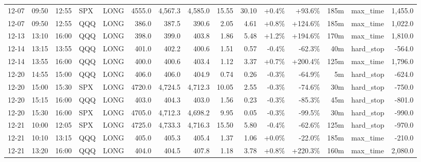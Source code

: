 \documentclass[11pt,a4paper,twoside]{article}
\begin{document}
\begin{landscape}
\begin{center}
\begin{longtable}{>{\color{txtmain}}l l l l l r r r r r r r r >{\color{txtmain}}l r}
12-07 & 09:50 & 12:55 & SPX & LONG & 4555.0 & 4,567.3 & 4,585.0 & 15.55 & 30.10 & \textcolor{wingreen}{+0.4\%} & \textcolor{wingreen}{+93.6\%} & 185m & max\_time & \textcolor{wingreen}{1,455.0} \\
12-07 & 09:50 & 12:55 & QQQ & LONG & 386.0 & 387.5 & 390.6 & 2.05 & 4.61 & \textcolor{wingreen}{+0.8\%} & \textcolor{wingreen}{+124.6\%} & 185m & max\_time & \textcolor{wingreen}{1,022.0} \\
12-13 & 13:10 & 16:00 & QQQ & LONG & 398.0 & 399.0 & 403.8 & 1.86 & 5.48 & \textcolor{wingreen}{+1.2\%} & \textcolor{wingreen}{+194.6\%} & 170m & max\_time & \textcolor{wingreen}{1,810.0} \\
12-14 & 13:15 & 13:55 & QQQ & LONG & 401.0 & 402.2 & 400.6 & 1.51 & 0.57 & \textcolor{lossred}{-0.4\%} & \textcolor{lossred}{-62.3\%} & 40m & hard\_stop & \textcolor{lossred}{-564.0} \\
12-14 & 13:55 & 16:00 & QQQ & LONG & 400.0 & 400.6 & 403.4 & 1.12 & 3.37 & \textcolor{wingreen}{+0.7\%} & \textcolor{wingreen}{+200.4\%} & 125m & max\_time & \textcolor{wingreen}{1,796.0} \\
12-20 & 14:55 & 15:00 & QQQ & LONG & 406.0 & 406.0 & 404.9 & 0.74 & 0.26 & \textcolor{lossred}{-0.3\%} & \textcolor{lossred}{-64.9\%} & 5m & hard\_stop & \textcolor{lossred}{-624.0} \\
12-20 & 15:00 & 15:30 & SPX & LONG & 4720.0 & 4,724.5 & 4,712.3 & 10.05 & 2.55 & \textcolor{lossred}{-0.3\%} & \textcolor{lossred}{-74.6\%} & 30m & hard\_stop & \textcolor{lossred}{-750.0} \\
12-20 & 15:15 & 16:00 & QQQ & LONG & 403.0 & 404.3 & 403.0 & 1.56 & 0.23 & \textcolor{lossred}{-0.3\%} & \textcolor{lossred}{-85.3\%} & 45m & hard\_stop & \textcolor{lossred}{-801.0} \\
12-20 & 15:30 & 16:00 & SPX & LONG & 4705.0 & 4,712.3 & 4,698.2 & 9.95 & 0.05 & \textcolor{lossred}{-0.3\%} & \textcolor{lossred}{-99.5\%} & 30m & hard\_stop & \textcolor{lossred}{-990.0} \\
12-21 & 10:00 & 12:05 & SPX & LONG & 4725.0 & 4,733.3 & 4,716.3 & 15.50 & 5.80 & \textcolor{lossred}{-0.4\%} & \textcolor{lossred}{-62.6\%} & 125m & hard\_stop & \textcolor{lossred}{-970.0} \\
12-21 & 10:10 & 13:15 & QQQ & LONG & 405.0 & 405.3 & 405.4 & 1.37 & 1.06 & \textcolor{wingreen}{+0.0\%} & \textcolor{lossred}{-22.0\%} & 185m & max\_time & \textcolor{lossred}{-210.0} \\
12-21 & 13:20 & 16:00 & QQQ & LONG & 404.0 & 404.5 & 407.8 & 1.18 & 3.78 & \textcolor{wingreen}{+0.8\%} & \textcolor{wingreen}{+220.3\%} & 160m & max\_time & \textcolor{wingreen}{2,080.0} \\

\end{longtable}
\end{center}
\end{landscape}
\end{document}
